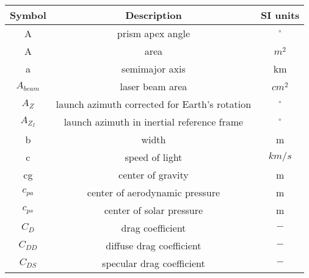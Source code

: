 \begin{center}
\begin{longtable}{c|c|c}

\textbf{Symbol} & \textbf{Description} & \textbf{SI units} \\\hline\hline
A																		& prism apex angle																												& $^\circ$ \\

A																		& area 																																		& $m^2$ \\

a																		& semimajor axis 																													& km \\

$A_{beam}$                    	    & laser beam area                               													& $cm^2$ \\

$A_Z$																& launch azimuth corrected for Earth's rotation  													& $^\circ$ \\

$A_{Z_I}$                           & launch azimuth in inertial reference frame  														& $^\circ$ \\

b                                  	& width                                       														& m \\

c                                   & speed of light                           																& $km/s$ \\

cg                                  & center of gravity                         															& m \\

$c_{pa}$                            & center of aerodynamic pressure            															& m \\

$c_{ps}$                            & center of solar pressure                   															& m \\

$C_D$																& drag coefficient 																												& $-$ \\

$C_{DD}$													  & diffuse drag coefficient																								& $-$ \\

$C_{DS}$						       					& specular drag coefficient 																							& $-$ \\


\end{longtable}
\end{center}
